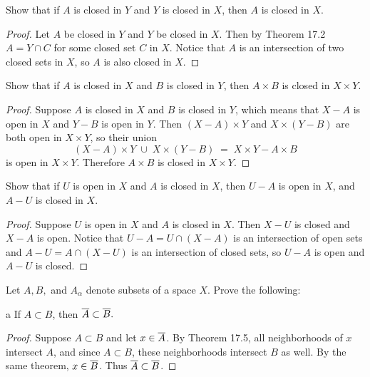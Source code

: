 \documentclass[11pt]{article}
\begin{document}
\begin{ex}{17.2}
  Show that if $A$ is closed in $Y$ and $Y$ is closed in $X$, then $A$ is closed
  in $X$.
\end{ex}

\begin{proof}
  Let $A$ be closed in $Y$ and $Y$ be closed in $X$. Then by Theorem 17.2 $A = Y
  \cap C$  for some closed set $C$ in $X$. Notice that $A$ is an intersection of two
  closed sets in $X$, so $A$ is also closed in $X$.
\end{proof}

\begin{ex}{17.3}
  Show that if $A$ is closed in $X$ and $B$ is closed in $Y$, then $A \times B$
  is closed in $X \times Y$.
\end{ex}

\begin{proof}
  Suppose $A$ is closed in $X$ and $B$ is closed in $Y$, which means that $X-A$
  is open in $X$ and $Y - B$ is open in $Y$. Then $(X-A) \times Y$ and $X \times
  (Y-B)$ are both open in $X \times Y$, so their union
  \[ (X - A) \times Y \;\cup\; X \times (Y-B) \;=\; X \times Y - A \times B \]
  is open in $X \times Y$. Therefore $A \times B$ is closed in $X \times Y$.
\end{proof}

\begin{ex}{17.4}
  Show that if $U$ is open in $X$ and $A$ is closed in $X$, then $U - A$ is open
  in $X$, and $A - U$ is closed in $X$.
\end{ex}

\begin{proof}
  Suppose $U$ is open in $X$ and $A$ is closed in $X$. Then $X - U$ is closed
  and $X - A$ is open. Notice that $U - A = U \cap (X - A)$ is an intersection
  of open sets and $A - U = A \cap (X - U)$ is an intersection of closed sets,
  so $U - A$ is open and $A - U$ is closed.
\end{proof}

\begin{ex}{17.6}
  Let $A, B,$ and $A_\alpha$ denote subsets of a space $X$. Prove the following:
\end{ex}

\begin{p}{a}
  If $A \subset B$, then ${ \overline{A} } \subset { \overline{B} }.$
\end{p}

\begin{proof}
  Suppose $A \subset B$ and let $x \in { \overline{A} }$. By Theorem 17.5, all
  neighborhoods of $x$ intersect $A$, and since $A \subset B$, these
  neighborhoods intersect $B$ as well. By the same theorem, $x \in { \overline{B} }$. Thus
  ${ \overline{A} } \subset { \overline{B} }$.
\end{proof}
\end{document}
